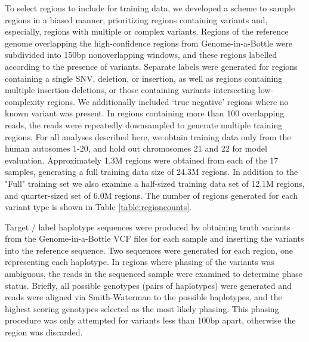 \documentclass[]{article}
\begin{document}
To select regions to include for training data, we developed a scheme to sample regions in a biased manner, prioritizing regions containing variants and, especially, regions with multiple or complex variants. Regions of the reference genome overlapping the high-confidence regions from Genome-in-a-Bottle were subdivided into 150bp nonoverlapping windows, and these regions labelled according to the presence of variants. Separate labels were generated for regions containing a single SNV, deletion, or insertion, as well as regions containing multiple insertion-deletions, or those containing variants intersecting low-complexity regions. We additionally included `true negative' regions where no known variant was present. In regions containing more than 100 overlapping reads, the reads were repeatedly downsampled to generate multiple training regions. For all analyses described here, we obtain training data only from the human autosomes 1-20, and hold out chromosomes 21 and 22 for model evaluation. Approximately 1.3M regions were obtained from each of the 17 samples, generating a full training data size of 24.3M regions. In addition to the "Full" training set we also examine a half-sized training data set of 12.1M regions, and quarter-sized set of 6.0M regions. The number of regions generated for each variant type is shown in Table \ref{table:regioncounts}. 

Target / label haplotype sequences were produced by obtaining truth variants from the Genome-in-a-Bottle VCF files for each sample and inserting the variants into the reference sequence. Two sequences were generated for each region, one representing each haplotype. In regions where phasing of the variants was ambiguous, the reads in the sequenced sample were examined to determine phase status. Briefly, all possible genotypes (pairs of haplotypes) were generated and reads were aligned via Smith-Waterman to the possible haplotypes, and the highest scoring genotypes selected as the most likely phasing. This phasing procedure was only attempted for variants less than 100bp apart, otherwise the region was discarded.
\end{document}
